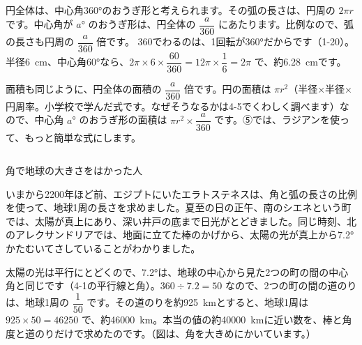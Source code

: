 円全体は、中心角360°のおうぎ形と考えられます。その弧の長さは、円周の $2\pi r$ です。中心角が $a$° のおうぎ形は、円全体の $\dfrac{a}{360}$ にあたります。比例なので、弧の長さも円周の $\dfrac{a}{360}$ 倍です。
360でわるのは、1回転が360°だからです（1-20）。半径\qty{6}{cm}、中心角60°なら、$2\pi\times6\times\dfrac{60}{360}=12\pi\times\dfrac{1}{6}=2\pi$ で、約\qty{6.28}{cm}です。

面積も同じように、円全体の面積の $\dfrac{a}{360}$ 倍です。円の面積は $\pi r^2$（半径×半径×円周率。小学校で学んだ式です。なぜそうなるかは4-5でくわしく調べます）なので、中心角 $a$° のおうぎ形の面積は $\pi r^2\times\dfrac{a}{360}$ です。⑤では、ラジアンを使って、もっと簡単な式にします。

\begin{column}{角で地球の大きさをはかった人}
\noindent\begin{minipage}[c]{0.6\linewidth}
いまから2200年ほど前、エジプトにいたエラトステネスは、角と弧の長さの比例を使って、地球1周の長さを求めました。夏至の日の正午、南のシエネという町では、太陽が真上にあり、深い井戸の底まで日光がとどきました。同じ時刻、北のアレクサンドリアでは、地面に立てた棒のかげから、太陽の光が真上から7.2°かたむいてさしていることがわかりました。
\end{minipage}\hfill
\begin{minipage}[c]{0.36\linewidth}\centering
{}
\end{minipage}

\par\vspace{3pt}
太陽の光は平行にとどくので、7.2°は、地球の中心から見た2つの町の間の中心角と同じです（4-1の平行線と角）。$360\div7.2=50$ なので、2つの町の間の道のりは、地球1周の $\dfrac{1}{50}$ です。その道のりを約\qty{925}{km}とすると、地球1周は $925\times50=\num{46250}$ で、約\qty{46000}{km}。本当の値の約\qty{40000}{km}に近い数を、棒と角度と道のりだけで求めたのです。（図は、角を大きめにかいています。）
\end{column}

